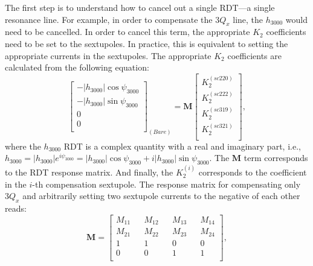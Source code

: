 The first step is to understand how to cancel out a single RDT---a single resonance line. For example, in order to compensate the $3Q_x$ line, the $h_{3000}$ would need to be cancelled. In order to cancel this term, the appropriate $K_2$ coefficients need to be set to the sextupoles. In practice, this is equivalent to setting the appropriate currents in the sextupoles. The appropriate $K_2$ coefficients are calculated from the following equation:
\begin{equation}
    \begin{bmatrix}
        -|h_{3000}| \cos \psi_{3000} \\
        -|h_{3000}| \sin \psi_{3000} \\
        0 \\
        0 \\
        \end{bmatrix}_{(Bare)}
         =
        \boldsymbol{M}
        \begin{bmatrix}
        K_2^{(sc220)} \\
        K_2^{(sc222)}\\
        K_2^{(sc319)} \\
        K_2^{(sc321)}\\
        \end{bmatrix},
        \label{eq:model1}
\end{equation}
where the $h_{3000}$ RDT is a complex quantity with a real and imaginary part, i.e., $h_{3000}= \left| h_{3000}\right|e^{i \psi_{3000}} = |h_{3000}| \cos \psi_{3000} + i |h_{3000}| \sin \psi_{3000}$. The $\boldsymbol{M}$ term corresponds to the RDT response matrix. And finally, the $K_2^{(i)}$ corresponds to the coefficient in the $i$-th compensation sextupole. The response matrix for compensating only $3Q_x$ and arbitrarily setting two sextupole currents to the negative of each other reads:
\begin{equation}
    \boldsymbol{M} = 
\begin{bmatrix}

M_{11} && M_{12} && M_{13} && M_{14}  \\ 

M_{21} && M_{22} && M_{23} && M_{24} \\ 

1 && 1 && 0 && 0 \\ 

0 && 0 && 1 && 1 \\

\end{bmatrix},
\label{eq:rm1}
\end{equation}
